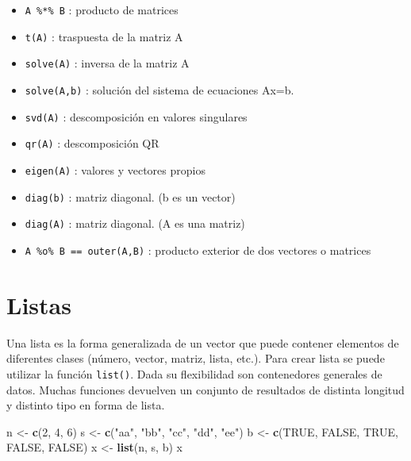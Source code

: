\documentclass[]{book}
\newenvironment{Shaded}{\begin{snugshade}}{\end{snugshade}}
\newcommand{\KeywordTok}[1]{\textcolor[rgb]{0.13,0.29,0.53}{\textbf{#1}}}
\newcommand{\DecValTok}[1]{\textcolor[rgb]{0.00,0.00,0.81}{#1}}
\newcommand{\StringTok}[1]{\textcolor[rgb]{0.31,0.60,0.02}{#1}}
\newcommand{\OtherTok}[1]{\textcolor[rgb]{0.56,0.35,0.01}{#1}}
\newcommand{\NormalTok}[1]{#1}
\providecommand{\tightlist}{%
  \setlength{\itemsep}{0pt}\setlength{\parskip}{0pt}}
\begin{document}
\begin{itemize}
\tightlist
\item
  \texttt{A\ \%*\%\ B} : producto de matrices
\item
  \texttt{t(A)} : traspuesta de la matriz A
\item
  \texttt{solve(A)} : inversa de la matriz A
\item
  \texttt{solve(A,b)} : solución del sistema de ecuaciones Ax=b.
\item
  \texttt{svd(A)} : descomposición en valores singulares
\item
  \texttt{qr(A)} : descomposición QR
\item
  \texttt{eigen(A)} : valores y vectores propios
\item
  \texttt{diag(b)} : matriz diagonal. (b es un vector)
\item
  \texttt{diag(A)} : matriz diagonal. (A es una matriz)
\item
  \texttt{A\ \%o\%\ B\ ==\ outer(A,B)} : producto exterior de dos
  vectores o matrices
\end{itemize}

\section{Listas}\label{listas}

Una lista es la forma generalizada de un vector que puede contener
elementos de diferentes clases (número, vector, matriz, lista, etc.).
Para crear lista se puede utilizar la función \texttt{list()}. Dada su
flexibilidad son contenedores generales de datos. Muchas funciones
devuelven un conjunto de resultados de distinta longitud y distinto tipo
en forma de lista.

\begin{Shaded}
\begin{Highlighting}[]
\NormalTok{n <-}\StringTok{  }\KeywordTok{c}\NormalTok{(}\DecValTok{2}\NormalTok{, }\DecValTok{4}\NormalTok{, }\DecValTok{6}\NormalTok{)}
\NormalTok{s <-}\StringTok{  }\KeywordTok{c}\NormalTok{(}\StringTok{"aa"}\NormalTok{, }\StringTok{"bb"}\NormalTok{, }\StringTok{"cc"}\NormalTok{, }\StringTok{"dd"}\NormalTok{, }\StringTok{"ee"}\NormalTok{)}
\NormalTok{b <-}\StringTok{  }\KeywordTok{c}\NormalTok{(}\OtherTok{TRUE}\NormalTok{, }\OtherTok{FALSE}\NormalTok{, }\OtherTok{TRUE}\NormalTok{, }\OtherTok{FALSE}\NormalTok{, }\OtherTok{FALSE}\NormalTok{)}
\NormalTok{x <-}\StringTok{  }\KeywordTok{list}\NormalTok{(n, s, b)}
\NormalTok{x}
\end{Highlighting}
\end{Shaded}
\end{document}
